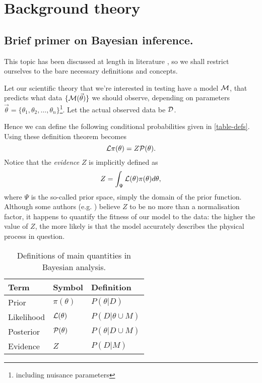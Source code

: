 \documentclass[usenatbib]{mnras}
\begin{document}
\section{Background theory}
\label{sec:orgb097a75}

\subsection{Brief primer on Bayesian inference.}
\label{sec:org4cb60a0}

This topic has been discussed at length in literature \citep{jeffreys2010scientific}, so we shall restrict ourselves to the bare necessary definitions and concepts. 

Let our scientific theory that we're interested in testing have a model \({\cal M}\), that predicts what data \(\lbrace {\cal M}(\vec{\theta})\rbrace\) we should observe, depending on parameters \(\vec{\theta} = \lbrace  \theta_1, \theta_2, \ldots, \theta_n \rbrace\)\footnote{including nuisance parameters}. Let the actual observed data be \({\cal D}\). 

   Hence we can define the following conditional probabilities given
in \autoref{table-defs}. Using these definition \citeauthor{1763} theorem
becomes 
\begin{equation}
{\cal L} \pi (\theta) = Z {\cal P} (\theta).
\label{eq:bayes} 
\end{equation}
Notice that the \emph{evidence} \(Z\) is
implicitly defined as 
\begin{equation} 
Z = \int_{\Psi} {\cal L}(\theta) \pi(\theta) d\theta, \label{eq:def-z}
\end{equation}
where \(\Psi\) is the so-called prior space, simply the domain of the
prior function. Although some authors
(e.g. \citeauthor{jeffreys2010scientific}) believe \(Z\) to be no more
than a normalisation factor, it happens to quantify the fitness of our
model to the data: the higher the value of \(Z\), the more likely is
that the model accurately describes the physical process in question.

\begin{table}[htbp]
\caption{Definitions of main quantities in Bayesian analysis. \label{table-defs}}
\centering
\begin{tabular}{lll}
\textbf{\textbf{Term}} & \textbf{\textbf{Symbol}} & \textbf{\textbf{Definition}}\\
\hline
Prior & \(\pi(\theta)\) & \(P ( \theta  \vert D)\)\\
Likelihood & \({\cal L}(\theta)\) & \(P ( D \vert \theta \cup M)\)\\
Posterior & \({\cal P}(\theta)\) & \(P ( \theta \vert D \cup M)\)\\
Evidence & \(Z\) & \(P ( D \vert M)\)\\
\end{tabular}
\end{table}
\end{document}
